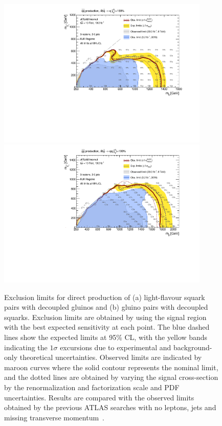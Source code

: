 \begin{figure}[tbph]
\begin{center}
\includegraphics[width=0.9\textwidth]{figures/ATLAS-CONF-2016-078_INT/Sensitivity/RJR/atlasCLs_SS_direct_showSR}
\includegraphics[width=0.9\textwidth]{figures/ATLAS-CONF-2016-078_INT/Sensitivity/RJR/atlasCLs_GG_direct_showSR}
\end{center}
\caption{Exclusion limits for direct production of (a) light-flavour squark pairs with decoupled gluinos and (b) gluino pairs with decoupled squarks.
Exclusion limits are obtained by using the signal region with the best expected sensitivity at each point.
The blue dashed lines show the expected limits at 95\% CL, with the yellow bands indicating the $1\sigma$ excursions due to experimental and background-only  theoretical uncertainties.
Observed limits are indicated by maroon curves where the solid contour represents the nominal limit, and the dotted lines are obtained by varying the signal cross-section by the renormalization and factorization scale and PDF uncertainties.
Results are compared with the observed limits obtained by the previous ATLAS searches with no leptons, jets and missing transverse momentum~\cite{SUSY-2015-06,SUSY-2013-02}.}
\label{fig:sensitivitytext}
\end{figure}